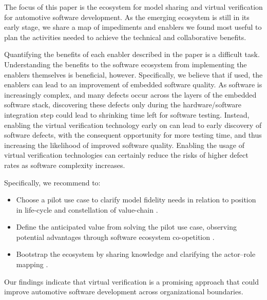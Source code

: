 The focus of this paper is the ecosystem for model sharing and virtual verification for automotive software development.
As the emerging ecosystem is still in its early stage, we share a map of impediments and enablers we found most useful to plan the activities needed to achieve the technical and collaborative benefits.

Quantifying the benefits of each enabler described in the paper is a difficult task.
Understanding the benefits to the software ecosystem from implementing the enablers themselves is beneficial, however. 
Specifically, we believe that if used, the enablers can lead to an improvement of embedded software quality.
As software is increasingly complex, and many defects occur across the layers of the embedded software stack, discovering these defects only during the hardware/software integration step could lead to shrinking time left for software testing.
Instead, enabling the virtual verification technology early on can lead to early discovery of software defects, with the consequent opportunity for more testing time, and thus increasing the likelihood of improved software quality.
Enabling the usage of virtual verification technologies can certainly reduce the risks of higher defect rates as software complexity increases.

Specifically, we recommend to:
\begin{itemize}
    \item Choose a pilot use case to clarify model fidelity needs in relation to position in life-cycle and constellation of value-chain \cite{Boehm1981}.
    \item Define the anticipated value from solving the pilot use case, observing potential advantages through software ecosystem co-opetition \cite{Agerfalk2008}.
    \item Bootstrap the ecosystem by sharing knowledge and clarifying the actor--role mapping \cite{kilamo2012proprietary}.
\end{itemize}


Our findings indicate that virtual verification is a promising approach that could improve automotive software development across organizational boundaries.




